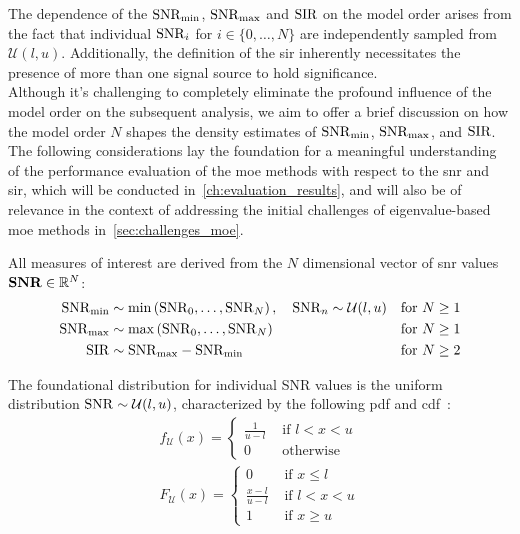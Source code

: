 The dependence of the \( \mathrm{SNR}_{\min} \), \( \mathrm{SNR}_{\max} \) and \( \mathrm{SIR} \) on the model order arises from the fact that
individual \( \mathrm{SNR}_i \) for \( i \in \{0, \ldots, N\} \) are independently sampled from \( \mathcal{U}(l,u) \).
Additionally, the definition of the \gls{sir} inherently necessitates the presence of more than one signal source to hold significance.\\
Although it's challenging to completely eliminate the profound influence of the model order on the subsequent analysis,
we aim to offer a brief discussion on how the model order \( N \) shapes the density estimates of \( \mathrm{SNR}_{\min} \), \( \mathrm{SNR}_{\max} \),
and \( \mathrm{SIR} \). \\
The following considerations lay the foundation for a meaningful understanding of the performance evaluation of
the \gls{moe} methods with respect to the \gls{snr} and \gls{sir}, which will be conducted in~\autoref{ch:evaluation_results},
and will also be of relevance in the context of addressing the initial challenges of eigenvalue-based \gls{moe} methods in~\autoref{sec:challenges_moe}.

All measures of interest are derived from the \( N \) dimensional vector of \gls{snr} values \( \boldsymbol{\mathrm{SNR}} \in \mathbb{R}^N\):
\begin{align}
    \mathrm{SNR}_{\min} & \sim \min\left(\mathrm{SNR}_0, \ldots, \mathrm{SNR}_N\right), \quad \mathrm{SNR}_n \sim  \mathcal{U}(l,u) & \text{for } N \geq 1 \\
    \mathrm{SNR}_{\max} & \sim \max\left(\mathrm{SNR}_0, \ldots, \mathrm{SNR}_N\right) & \text{for } N \geq 1 \\
    \mathrm{SIR} & \sim \mathrm{SNR}_{\max} - \mathrm{SNR}_{\min} & \text{for } N \geq 2
    \label{eq:snr_sir_dist}
\end{align}


The foundational distribution for individual SNR values is the uniform distribution \(\mathrm{SNR} \sim \mathcal{U}(l,u)\),
characterized by the following \gls{pdf} and \gls{cdf}~\cite[Chapter 5.2]{blitzstein2019}:
\begin{align}
    f_{\mathcal{U}}(x)= \begin{cases} \frac{1}{u-l} & \text { if } l<x<u \\ 0 & \text { otherwise } \end{cases} \label{eq:uniform_pdf}\\
    F_{\mathcal{U}}(x)= \begin{cases} 0 & \text { if } x \leq l \\ \frac{x-l}{u-l} & \text { if } l<x<u \\ 1 & \text { if } x \geq u \end{cases}
    \label{eq:uniform_cdf}
\end{align}


